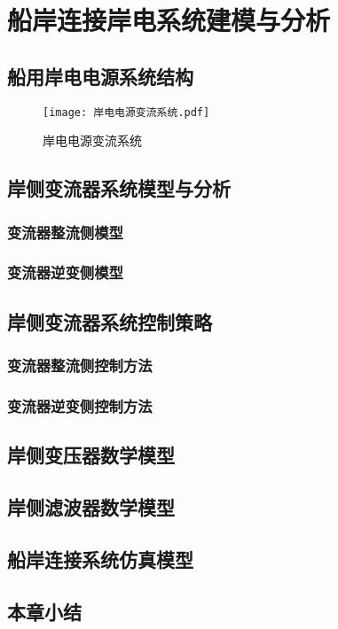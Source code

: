 \chapter{船岸连接岸电系统建模与分析}

\section{船用岸电电源系统结构}



\begin{figure}[!htp]
	\centering
	\texttt{[image: 岸电电源变流系统.pdf]}
	\caption{岸电电源变流系统}
	\label{fig:岸电电源变流系统}
\end{figure}



\section{岸侧变流器系统模型与分析}


\subsection{变流器整流侧模型}


\subsection{变流器逆变侧模型}


\section{岸侧变流器系统控制策略}


\subsection{变流器整流侧控制方法}


\subsection{变流器逆变侧控制方法}


\section{岸侧变压器数学模型}


\section{岸侧滤波器数学模型}


\section{船岸连接系统仿真模型}


\section{本章小结}